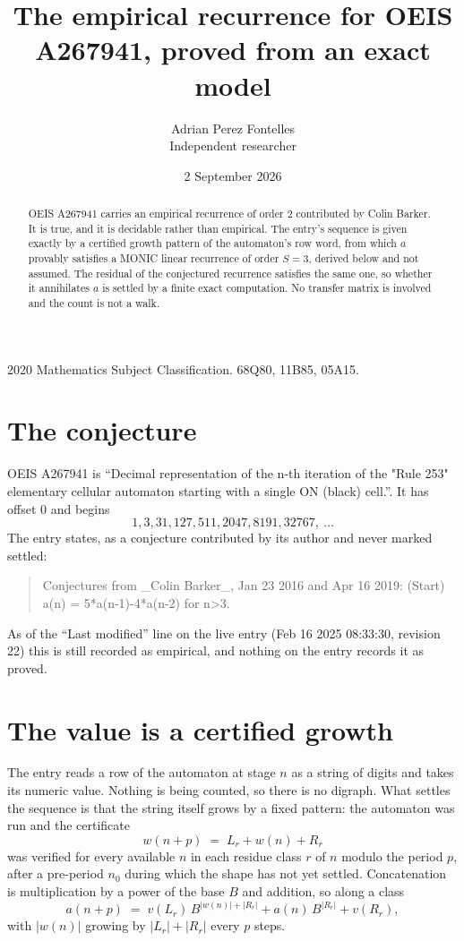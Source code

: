 \documentclass[11pt,a4paper]{article}
\title{The empirical recurrence for OEIS A267941, proved from an exact model}
\author{Adrian Perez Fontelles\\ \small Independent researcher}
\date{2 September 2026}
\theoremstyle{plain}
\theoremstyle{definition}
\begin{document}
\maketitle

\begin{abstract}
OEIS A267941 carries an empirical recurrence of order $2$ contributed by Colin Barker. It is true, and it is
decidable rather than empirical. The entry's sequence is given exactly by a certified growth pattern of the automaton's row word, from
which $a$ provably satisfies a MONIC linear recurrence of order $S=3$, derived below and not
assumed. The residual of the conjectured recurrence satisfies the same one, so whether it
annihilates $a$ is settled by a finite exact computation. No transfer matrix is involved and
the count is not a walk.
\end{abstract}

\noindent\small 2020 Mathematics Subject Classification. 68Q80, 11B85, 05A15.\normalsize

\section{The conjecture}

OEIS A267941 is ``Decimal representation of the n-th iteration of the "Rule 253" elementary cellular automaton starting with a single ON (black) cell.''. It has offset $0$ and begins
\[
1, 3, 31, 127, 511, 2047, 8191, 32767,\ \dots
\]
The entry states, as a conjecture contributed by its author and never marked settled:
\begin{quote}
Conjectures from \_Colin Barker\_, Jan 23 2016 and Apr 16 2019: (Start) a(n) = 5*a(n-1)-4*a(n-2) for n>3.
\end{quote}
As of the ``Last modified'' line on the live entry (Feb 16 2025 08:33:30, revision 22)
this is still recorded as empirical, and nothing on the entry records it as proved.

\section{The value is a certified growth}

The entry reads a row of the automaton at stage $n$ as a string of digits and takes its
numeric value. Nothing is being counted, so there is no digraph. What settles the sequence is
that the string itself grows by a fixed pattern: the automaton was run and the certificate
\[
w(n+p)\;=\;L_r + w(n) + R_r
\]
was verified for every available $n$ in each residue class $r$ of $n$ modulo the period $p$,
after a pre-period $n_0$ during which the shape has not yet settled. Concatenation is
multiplication by a power of the base $B$ and addition, so along a class
\[
a(n+p)\;=\;v(L_r)\,B^{|w(n)|+|R_r|} + a(n)\,B^{|R_r|} + v(R_r),
\]
with $|w(n)|$ growing by $|L_r|+|R_r|$ every $p$ steps.
\end{document}
